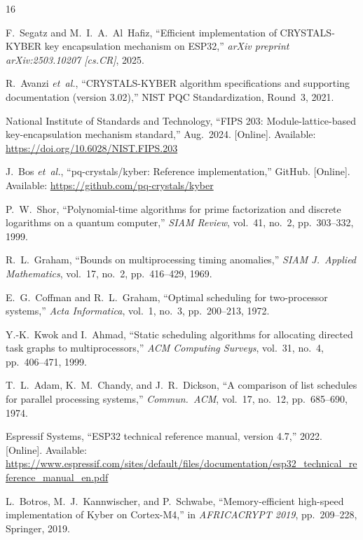 \documentclass[conference]{IEEEtran}
\begin{document}
\begin{thebibliography}{16}

F.~Segatz and M.~I.~A.~Al~Hafiz, ``Efficient implementation of CRYSTALS-KYBER key encapsulation mechanism on ESP32,'' \emph{arXiv preprint arXiv:2503.10207 [cs.CR]}, 2025.

R.~Avanzi \emph{et~al.}, ``CRYSTALS-KYBER algorithm specifications and supporting documentation (version 3.02),'' NIST PQC Standardization, Round~3, 2021.

National Institute of Standards and Technology, ``FIPS 203: Module-lattice-based key-encapsulation mechanism standard,'' Aug.\ 2024. [Online]. Available: \url{https://doi.org/10.6028/NIST.FIPS.203}

J.~Bos \emph{et~al.}, ``pq-crystals/kyber: Reference implementation,'' GitHub. [Online]. Available: \url{https://github.com/pq-crystals/kyber}

P.~W.~Shor, ``Polynomial-time algorithms for prime factorization and discrete logarithms on a quantum computer,'' \emph{SIAM Review}, vol.~41, no.~2, pp.~303--332, 1999.

R.~L.~Graham, ``Bounds on multiprocessing timing anomalies,'' \emph{SIAM J.\ Applied Mathematics}, vol.~17, no.~2, pp.~416--429, 1969.

E.~G.~Coffman and R.~L.~Graham, ``Optimal scheduling for two-processor systems,'' \emph{Acta Informatica}, vol.~1, no.~3, pp.~200--213, 1972.

Y.-K.~Kwok and I.~Ahmad, ``Static scheduling algorithms for allocating directed task graphs to multiprocessors,'' \emph{ACM Computing Surveys}, vol.~31, no.~4, pp.~406--471, 1999.

T.~L.~Adam, K.~M.~Chandy, and J.~R.~Dickson, ``A comparison of list schedules for parallel processing systems,'' \emph{Commun.\ ACM}, vol.~17, no.~12, pp.~685--690, 1974.

Espressif Systems, ``ESP32 technical reference manual, version 4.7,'' 2022. [Online]. Available: \url{https://www.espressif.com/sites/default/files/documentation/esp32_technical_reference_manual_en.pdf}

L.~Botros, M.~J.~Kannwischer, and P.~Schwabe, ``Memory-efficient high-speed implementation of Kyber on Cortex-M4,'' in \emph{AFRICACRYPT 2019}, pp.~209--228, Springer, 2019.


\end{thebibliography}
\end{document}

